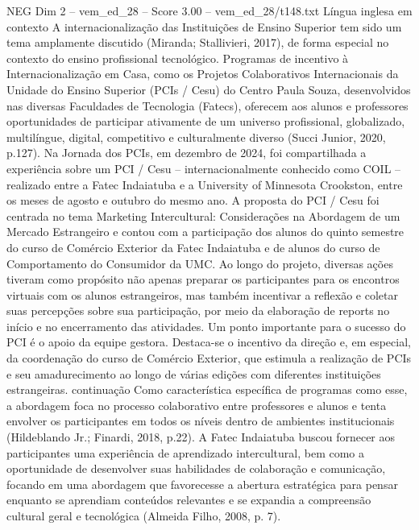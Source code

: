 \begin{textsample}{NEG Dim 2 – vem\_ed\_28 – Score 3.00 – vem\_ed\_28/t148.txt}  \label{ex:f2_neg_114}
Língua inglesa em contexto A internacionalização das Instituições de Ensino Superior tem sido um tema amplamente discutido (Miranda; Stallivieri, 2017), de forma especial no contexto do ensino profissional tecnológico.
Programas de incentivo à Internacionalização em Casa, como os Projetos Colaborativos Internacionais da Unidade do Ensino Superior (PCIs / Cesu) do Centro Paula Souza, desenvolvidos nas diversas Faculdades de Tecnologia (Fatecs), oferecem aos alunos e professores oportunidades de participar ativamente de um universo profissional, globalizado, multilíngue, digital, competitivo e culturalmente diverso (Succi Junior, 2020, p.127).
Na Jornada dos PCIs, em dezembro de 2024, foi compartilhada a experiência sobre um PCI / Cesu – internacionalmente conhecido como COIL – realizado entre a Fatec Indaiatuba e a University of Minnesota Crookston, entre os meses de agosto e outubro do mesmo ano.
A proposta do PCI / Cesu foi centrada no tema Marketing Intercultural: Considerações na Abordagem de um Mercado Estrangeiro e contou com a participação dos alunos do quinto semestre do curso de Comércio Exterior da Fatec Indaiatuba e de alunos do curso de Comportamento do Consumidor da UMC.
Ao longo do projeto, diversas ações tiveram como propósito não apenas preparar os participantes para os encontros virtuais com os alunos estrangeiros, mas também incentivar a reflexão e coletar suas percepções sobre sua participação, por meio da elaboração de reports no início e no encerramento das atividades.
Um ponto importante para o sucesso do PCI é o apoio da equipe gestora.
Destaca-se o incentivo da direção e, em especial, da coordenação do curso de Comércio Exterior, que estimula a realização de PCIs e seu amadurecimento ao longo de várias edições com diferentes instituições estrangeiras. continuação Como característica específica de programas como esse, a abordagem foca no processo colaborativo entre professores e alunos e tenta envolver os participantes em todos os níveis dentro de ambientes institucionais (Hildeblando Jr.; Finardi, 2018, p.22).
A Fatec Indaiatuba buscou fornecer aos participantes uma experiência de aprendizado intercultural, bem como a oportunidade de desenvolver suas habilidades de colaboração e comunicação, focando em uma abordagem que favorecesse a abertura estratégica para pensar enquanto se aprendiam conteúdos relevantes e se expandia a compreensão cultural geral e tecnológica (Almeida Filho, 2008, p. 7).

\end{textsample}
